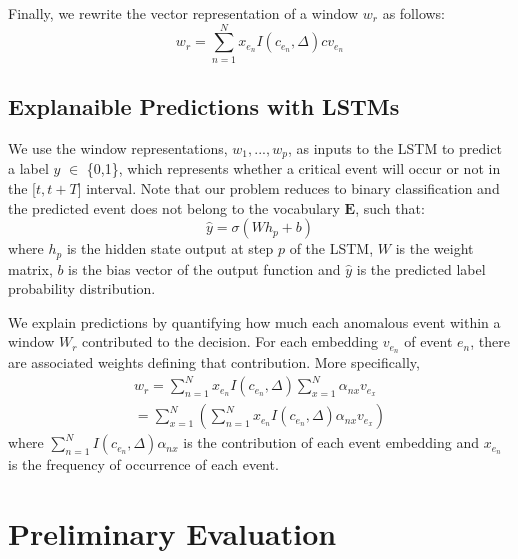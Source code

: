 \documentclass[letterpaper]{article} %
\begin{document}
Finally, we rewrite the vector representation of a window $w_{r}$ as follows:
\begin{equation}
w_{r} = \sum_{n=1}^{N} x_{e_{n}} I(c_{e_{n}}, \Delta) cv_{e_{n}}
\end{equation}

\subsection{Explanaible Predictions with LSTMs}
We use the window representations, $w_{1}, ..., w_{p}$, as inputs to the LSTM to predict a label $y$ $\in$ \{0,1\}, which represents whether a critical event will occur or not in the [$t, t+T$] interval. Note that our problem reduces to binary classification and the predicted event does not belong to the vocabulary $\mathbf{E}$, such that:
\begin{equation}
\hat{y} = \sigma(W h_{p} + b)
\end{equation}
\noindent where $h_{p}$ is the hidden state output at step $p$ of the LSTM, $W$ is the weight matrix, $b$ is the bias vector of the output function and $\hat{y}$ is the predicted label probability distribution.

We explain predictions by quantifying how much each anomalous event within a window $W_{r}$ contributed to the decision. For each embedding $v_{e_{n}}$ of event $e_{n}$, there are associated weights defining that contribution. More specifically,
\begin{equation}
\begin{split}
w_{r} = \sum_{n=1}^{N} x_{e_{n}} I(c_{e_{n}}, \Delta) \sum_{x=1}^{N} {\alpha}_{nx} v_{e_{x}} \\
= \sum_{x=1}^{N}(\sum_{n=1}^{N} x_{e_{n}} I(c_{e_{n}}, \Delta)\alpha_{nx} v_{e_{x}})
\end{split}
\end{equation}
\noindent where $\sum_{n=1}^{N} I(c_{e_{n}}, \Delta)\alpha_{nx}$ is the contribution of each event embedding and $ x_{e_{n}}$ is the frequency of occurrence of each event.

\section{Preliminary Evaluation}
\end{document}
